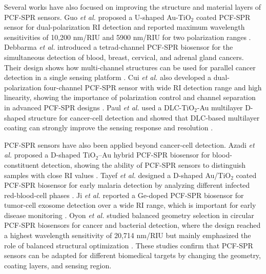 \documentclass[preprint,12pt]{elsarticle}
\begin{document}
Several works have also focused on improving the structure and material layers of PCF-SPR sensors. Guo \emph{et al.} proposed a U-shaped Au-TiO$_2$ coated PCF-SPR sensor for dual-polarization RI detection and reported maximum wavelength sensitivities of 10,200 nm/RIU and 5900 nm/RIU for two polarization ranges \cite{guo2025dual}. Debbarma \emph{et al.} introduced a tetrad-channel PCF-SPR biosensor for the simultaneous detection of blood, breast, cervical, and adrenal gland cancers. Their design shows how multi-channel structures can be used for parallel cancer detection in a single sensing platform \cite{debbarma2026tetrad}. Cui \emph{et al.} also developed a dual-polarization four-channel PCF-SPR sensor with wide RI detection range and high linearity, showing the importance of polarization control and channel separation in advanced PCF-SPR designs \cite{cui2026high}. Paul \emph{et al.} used a DLC-TiO$_2$-Au multilayer D-shaped structure for cancer-cell detection and showed that DLC-based multilayer coating can strongly improve the sensing response and resolution \cite{paul2025dlc}.

PCF-SPR sensors have also been applied beyond cancer-cell detection. Azadi \emph{et al.} proposed a D-shaped TiO$_2$--Au hybrid PCF-SPR biosensor for blood-constituent detection, showing the ability of PCF-SPR sensors to distinguish samples with close RI values \cite{azadi2025ultrahigh}. Tayef \emph{et al.} designed a D-shaped Au/TiO$_2$ coated PCF-SPR biosensor for early malaria detection by analyzing different infected red-blood-cell phases \cite{tayef2025highly}. Ji \emph{et al.} reported a Ge-doped PCF-SPR biosensor for tumor-cell exosome detection over a wide RI range, which is important for early disease monitoring \cite{ji2026high}. Oyon \emph{et al.} studied balanced geometry selection in circular PCF-SPR biosensors for cancer and bacterial detection, where the design reached a highest wavelength sensitivity of 20,714 nm/RIU but mainly emphasized the role of balanced structural optimization \cite{oyon2026numerical}. These studies confirm that PCF-SPR sensors can be adapted for different biomedical targets by changing the geometry, coating layers, and sensing region.
\end{document}
